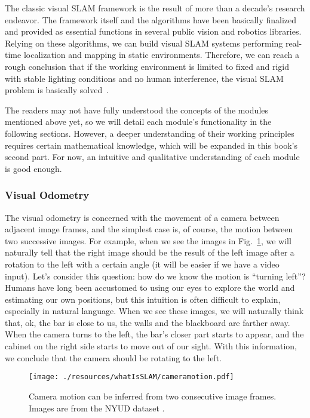 The classic visual SLAM framework is the result of more than a decade's research endeavor. The framework itself and the algorithms have been basically finalized and provided as essential functions in several public vision and robotics libraries. Relying on these algorithms, we can build visual SLAM systems performing real-time localization and mapping in static environments. Therefore, we can reach a rough conclusion that if the working environment is limited to fixed and rigid with stable lighting conditions and no human interference, the visual SLAM problem is basically solved~\cite{Cadena2016}.

The readers may not have fully understood the concepts of the modules mentioned above yet, so we will detail each module's functionality in the following sections. However, a deeper understanding of their working principles requires certain mathematical knowledge, which will be expanded in this book's second part. For now, an intuitive and qualitative understanding of each module is good enough.

\subsubsection{Visual Odometry}

The visual odometry is concerned with the movement of a camera between adjacent image frames, and the simplest case is, of course, the motion between two successive images. For example, when we see the images in Fig.~\ref{fig:cameramotion}, we will naturally tell that the right image should be the result of the left image after a rotation to the left with a certain angle (it will be easier if we have a video input). Let's consider this question: how do we know the motion is ``turning left''? Humans have long been accustomed to using our eyes to explore the world and estimating our own positions, but this intuition is often difficult to explain, especially in natural language. When we see these images, we will naturally think that, ok, the bar is close to us, the walls and the blackboard are farther away. When the camera turns to the left, the bar's closer part starts to appear, and the cabinet on the right side starts to move out of our sight. With this information, we conclude that the camera should be rotating to the left.

\begin{figure}
    \centering
    \texttt{[image: ./resources/whatIsSLAM/cameramotion.pdf]}
    \caption{Camera motion can be inferred from two consecutive image frames. Images are from the NYUD dataset \cite{Silberman2012}.}
    \label{fig:cameramotion}
\end{figure}

